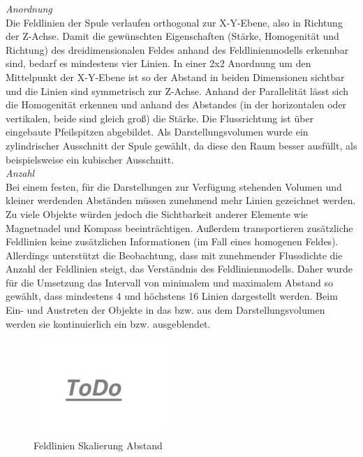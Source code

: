 \textit{Anordnung}\\
Die Feldlinien der Spule verlaufen orthogonal zur X-Y-Ebene, also in Richtung der Z-Achse. Damit die gewünschten Eigenschaften (Stärke, Homogenität und Richtung) des dreidimensionalen Feldes anhand des Feldlinienmodells erkennbar sind, bedarf es mindestens vier Linien. In einer 2x2 Anordnung um den Mittelpunkt der X-Y-Ebene ist so der Abstand in beiden Dimensionen sichtbar und die Linien sind symmetrisch zur Z-Achse. Anhand der Parallelität lässt sich die Homogenität erkennen und anhand des Abstandes (in der horizontalen oder vertikalen, beide sind gleich groß) die Stärke. Die Flussrichtung ist über eingebaute Pfeilspitzen abgebildet. Als Darstellungsvolumen wurde ein zylindrischer Ausschnitt der Spule gewählt, da diese den Raum besser ausfüllt, als beispielsweise ein kubischer Ausschnitt.\\

\textit{Anzahl}\\
Bei einem festen, für die Darstellungen zur Verfügung stehenden Volumen und kleiner werdenden Abständen müssen zunehmend mehr Linien gezeichnet werden. Zu viele Objekte würden jedoch die Sichtbarkeit anderer Elemente wie Magnetnadel und Kompass beeinträchtigen. Außerdem transportieren zusätzliche Feldlinien keine zusätzlichen Informationen (im Fall eines homogenen Feldes). Allerdings unterstützt die Beobachtung, dass mit zunehmender Flussdichte die Anzahl der Feldlinien steigt, das Verständnis des Feldlinienmodells. Daher wurde für die Umsetzung das Intervall von minimalem und maximalem Abstand so gewählt, dass mindestens 4 und höchstens 16 Linien dargestellt werden. Beim Ein- und Austreten der Objekte in das bzw. aus dem Darstellungsvolumen werden sie kontinuierlich ein bzw. ausgeblendet.\\

\begin{figure}[H]
	\centering
	\includegraphics[width=0.45\textwidth]{images/todo.jpg}
	\caption{Feldlinien Skalierung Abstand}
	\label{img:mfield-lines-scaling}
\end{figure}

